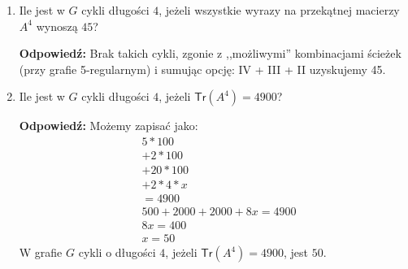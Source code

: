 \documentclass[a4paper,12pt]{article}
\theoremstyle{definition}%
\theoremstyle{definition}
\theoremstyle{problem}
\begin{document}
\begin{enumerate}[label=\alph*)]
\item Ile jest w $G$ cykli długości $4$, jeżeli wszystkie wyrazy na przekątnej	macierzy $A^4$ wynoszą $45$?

\textbf{Odpowiedź: }Brak takich cykli, zgonie z ,,możliwymi'' kombinacjami ścieżek (przy grafie 5-regularnym) i sumując opcję: IV + III + II uzyskujemy 45.
\item Ile jest w $G$ cykli długości $4$, jeżeli $\mathsf{Tr}(A^4) = 4900$?

\textbf{Odpowiedź: }Możemy zapisać jako:
\begin{align*}
& 5*100 \tag*{Zgodnie z możliwą ścieżką nr IV}\\ 
&+ 2*100 \tag*{ścieżka nr III}\\ 
&+ 20*100 \tag*{ścieżka nr II}\\ 
&+ 2*4*x \tag*{ścieżka nr I i poszukiwana wartość $x$ - liczba cykli} \\ 
&= 4900\\
& 500+2000+2000+8x=4900 \\
& 8x = 400\\
& x = 50
\end{align*}
W grafie $G$ cykli o długości $4$, jeżeli $\mathsf{Tr}(A^4) = 4900$, jest $50$.
\end{enumerate}
\end{document}
